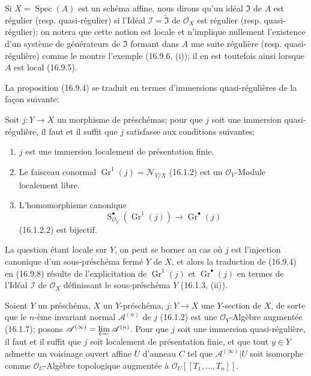 \begin{env}[16.9.7]
\label{IV.16.9.7}
Si $X=\operatorname{Spec}(A)$ est un schéma affine, nous dirons qu'un idéal
$\mathfrak{I}$ de $A$ est régulier (resp. quasi-régulier) si l'Idéal
$\mathscr{I}=\widetilde{\mathfrak{I}}$ de $\mathcal{O}_X$ est régulier
(resp. quasi-régulier); on notera que cette notion est locale et n'implique
nullement l'existence d'un système de générateurs de $\mathfrak{I}$ formant
dans $A$ une suite régulière (resp. quasi-régulière) comme le montre l'exemple
(16.9.6, (i)); il en est toutefois ainsi lorsque $A$ est local (16.9.5).

La proposition (16.9.4) se traduit en termes d'immersions quasi-régulières de
la façon suivante:
\end{env}

\begin{proposition}[16.9.8]
\label{IV.16.9.8}
Soit $j:Y\to X$ un morphisme de préschémas; pour que $j$ soit une immersion
quasi-régulière, il faut et il suffit que $j$ satisfasse aux conditions
suivantes:
\begin{enumerate}
  \item[(i)] $j$ est une immersion localement de présentation finie.
  \item[(ii)] Le faisceau conormal
  $\operatorname{Gr}^1(j)=\mathcal{N}_{Y/X}$ (16.1.2) est un
  $\mathcal{O}_Y$-Module localement libre.
  \item[(iii)] L'homomorphisme canonique
  \[
    \operatorname{S}_{\mathcal{O}_Y}^{\bullet}
      (\operatorname{Gr}^1(j))\longrightarrow\operatorname{Gr}^{\bullet}(j)
  \]
  (16.1.2.2) est bijectif.
\end{enumerate}
\end{proposition}

La question étant locale sur $Y$, on peut se borner au cas où $j$ est
l'injection canonique d'un sous-préschéma fermé $Y$ de $X$, et alors la
traduction de (16.9.4) en (16.9.8) résulte de l'explicitation de
$\operatorname{Gr}^1(j)$ et $\operatorname{Gr}^{\bullet}(j)$ en termes de
l'Idéal $\mathscr{I}$ de $\mathcal{O}_X$ définissant le sous-préschéma $Y$
(16.1.3, (ii)).

\begin{corollary}[16.9.9]
\label{IV.16.9.9}
Soient $Y$ un préschéma, $X$ un $Y$-préschéma, $j:Y\to X$ une $Y$-section
de $X$, de sorte que le $n$-ème invariant normal $\mathscr{A}^{(n)}$ de $j$
(16.1.2) est une $\mathcal{O}_Y$-Algèbre augmentée (16.1.7); posons
$\mathscr{A}^{(\infty)}=\varprojlim\mathscr{A}^{(n)}$. Pour que $j$ soit une
immersion quasi-régulière, il faut et il suffit que $j$ soit localement de
présentation finie, et que tout $y\in Y$ admette un voisinage ouvert affine
$U$ d'anneau $C$ tel que $\mathscr{A}^{(\infty)}|U$ soit isomorphe comme
$\mathcal{O}_U$-Algèbre topologique augmentée à
$\mathcal{O}_U[[T_1,\ldots,T_n]]$.
\end{corollary}

